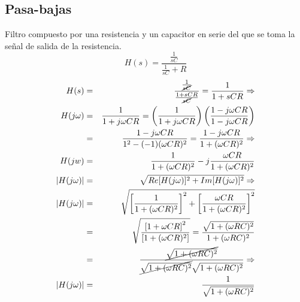 \documentclass[12pt,spanish,lettersize]{report}
\begin{document}
\subsection{Pasa-bajas}
Filtro compuesto por una resistencia y un capacitor en serie del que se toma la se\~nal de salida de la resistencia.\\
\begin{equation}
H(s)=\frac{\frac{1}{sC}}{\frac{1}{sC}+R}
\end{equation}
\begin{eqnarray}
\nonumber H(s)&=&\frac{\frac{1}{\cancel{sC}}}{\frac{1+sCR}{\cancel{sC}}}=\frac{1}{1+sCR}\Rightarrow\\
\nonumber H(j\omega)&=&\frac{1}{1+j\omega CR}=\left(\frac{1}{1+j\omega CR}\right)\left(\frac{1-j\omega CR}{1-j\omega CR}\right)\\
\nonumber&=&\frac{1-j\omega CR}{1^2-(-1)(\omega CR)^2}=\frac{1-j\omega CR}{1+(\omega CR)^2}\Rightarrow\\
\nonumber H(jw)&=&\frac{1}{1+(\omega CR)^2}-j\frac{\omega CR}{1+(\omega CR)^2}\\
\nonumber|H(j\omega)|&=&\sqrt{Re[H(j\omega)]^2+Im[H(j\omega)]^2}\Rightarrow\\
\nonumber|H(j\omega)|&=&\sqrt{\left[\frac{1}{1+(\omega CR)^2}\right]^2+\left[\frac{\omega CR}{1+(\omega CR)^2}\right]^2}\\
\nonumber&=&\sqrt{\frac{\left[1+\omega CR\right]^2}{\left[1+(\omega CR)^2\right]}}=\frac{\sqrt{1+(\omega RC)^2}}{1+(\omega RC)^2}\\
\nonumber&=&\frac{\cancel{\sqrt{1+(\omega RC)^2}}}{\cancel{\sqrt{1+(\omega RC)^2}}\sqrt{1+(\omega RC)^2}}\Rightarrow\\
|H(j\omega)|&=&\frac{1}{\sqrt{1+(\omega RC)^2}}
\end{eqnarray}
\end{document}

